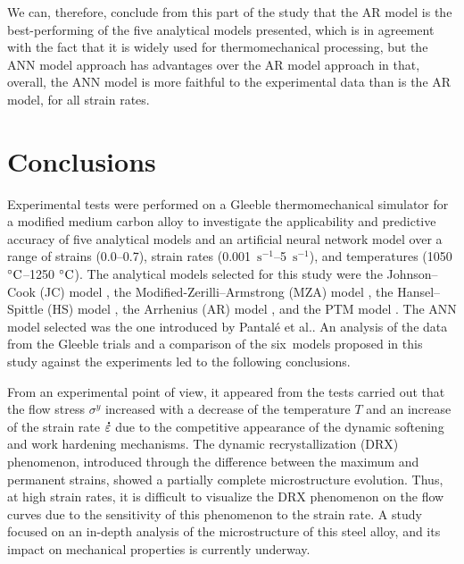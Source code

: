\documentclass[metals,article,accept,pdftex,moreauthors]{Definitions/mdpi}
\makeatletter
\DeclareRobustCommand{\mdot}[1]{\accentset{\mbox{\bfseries .}}{#1}}
\DeclareRobustCommand{\eal}{et al.\@\xspace}
\DeclareRobustCommand{\ps}{\text{s}^{-1}}
\makeatother
\begin{document}
We can, therefore, conclude from this part of the study that the AR model is the best-performing of the five analytical models presented, which is in agreement with the fact that it is widely used for thermomechanical processing, but the ANN model approach has advantages over the AR model approach in that, overall, the ANN model is more faithful to the experimental data than is the AR model, for all strain rates.

\section{Conclusions\label{sec:Conclusion}}

Experimental tests were performed on a Gleeble thermomechanical simulator for a modified medium carbon alloy to investigate the applicability and predictive accuracy of five analytical models and an artificial neural network model over a range of strains (0.0--0.7), strain rates (0.001~$\ps$--5~$\ps$), and temperatures (1050 $\celsius$--1250 $\celsius$).
The analytical models selected for this study were the Johnson--Cook (JC) model \cite{Johnson-1983}, the Modified-Zerilli--Armstrong (MZA) model \cite{Samantaray-2009}, the Hansel--Spittle (HS) model \cite{Hensel-1978}, the Arrhenius (AR) model \cite{Sellars-1966}, and the PTM model \cite{TizeMha-2022}.
The ANN model selected was the one introduced by Pantalé \eal \cite{Pantale-2021}.
An analysis of the data from the Gleeble trials and a comparison of the six~models proposed in this study against the experiments led to the following conclusions.

From an experimental point of view, it appeared from the tests carried out that the flow stress $\sigma^y$ increased with a decrease of the temperature $T$ and an increase of the strain rate $\mdot\varepsilon$ due to the competitive appearance of the dynamic softening and work hardening mechanisms.
The dynamic recrystallization (DRX) phenomenon, introduced through the difference between the maximum and permanent strains, showed a partially complete microstructure evolution.
Thus, at high strain rates, it is difficult to visualize the DRX phenomenon on the flow curves due to the sensitivity of this phenomenon to the strain rate.
A study focused on an in-depth analysis of the microstructure of this steel alloy, and its impact on mechanical properties is currently underway.
\end{document}
